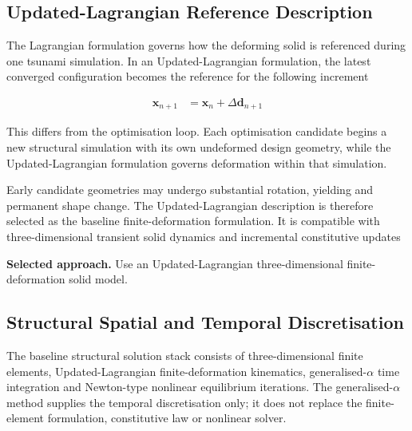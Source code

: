 \subsection{Updated-Lagrangian Reference Description}
\label{subsec:res_str_rsp_updated_lagrangian}

The Lagrangian formulation governs how the deforming solid is referenced during one tsunami simulation. In an Updated-Lagrangian formulation, the latest converged configuration becomes the reference for the following increment

\begin{align}
\bm{x}_{n+1}
&=
\bm{x}_{n}
+
\Delta\bm{d}_{n+1}
\label{eq:res_str_rsp_updated_lagrangian_position}
\end{align}

This differs from the optimisation loop. Each optimisation candidate begins a new structural simulation with its own undeformed design geometry, while the Updated-Lagrangian formulation governs deformation within that simulation.

Early candidate geometries may undergo substantial rotation, yielding and permanent shape change. The Updated-Lagrangian description is therefore selected as the baseline finite-deformation formulation. It is compatible with three-dimensional transient solid dynamics and incremental constitutive updates \autocite{nemer2021}

\textbf{Selected approach.} Use an Updated-Lagrangian three-dimensional finite-deformation solid model.



\subsection{Structural Spatial and Temporal Discretisation}
\label{subsec:res_str_sim_spatial_temporal_discretisation}

The baseline structural solution stack consists of three-dimensional finite elements, Updated-Lagrangian finite-deformation kinematics, generalised-\(\alpha\) time integration and Newton-type nonlinear equilibrium iterations. The generalised-\(\alpha\) method supplies the temporal discretisation only; it does not replace the finite-element formulation, constitutive law or nonlinear solver.

